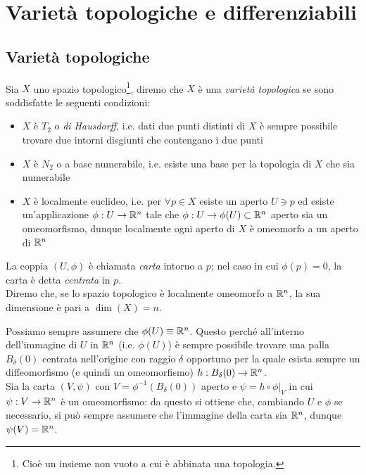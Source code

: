 \section{Varietà topologiche e differenziabili}

\subsection{Varietà topologiche}

Sia $ X $ uno spazio topologico\footnote{%
	Cioè un insieme non vuoto a cui è abbinata una topologia.%
}, diremo che $ X $ è una \textit{varietà topologica} se sono soddisfatte le seguenti condizioni:

\begin{itemize}
	\item $ X $ è $ T_{2} $ o \textit{di Hausdorff}, i.e. dati due punti distinti di $ X $ è sempre possibile trovare due intorni disgiunti che contengano i due punti
	
	\item $ X $ è $ N_{2} $ o a base numerabile, i.e. esiste una base per la topologia di $ X $ che sia numerabile
	
	\item $ X $ è localmente euclideo, i.e. per $ \forall p \in X $ esiste un aperto $ U \ni p $ ed esiste un'applicazione $ \phi : U \to \mathbb{R}^{n} $ tale che $ \phi : U \to \phi(U) \subset \mathbb{R}^{n} $ aperto sia un omeomorfismo, dunque localmente ogni aperto di $ X $ è omeomorfo a un aperto di $ \mathbb{R}^{n} $
\end{itemize}

La coppia $ (U,\phi) $ è chiamata \textit{carta} intorno a $ p $; nel caso in cui $ \phi(p)=0 $, la carta è detta \textit{centrata} in $ p $.\\
Diremo che, se lo spazio topologico è localmente omeomorfo a $ \mathbb{R}^{n} $, la sua dimensione è pari a $ \dim (X) = n $.

\begin{remark}
	Possiamo sempre assumere che $ \phi(U) \equiv \mathbb{R}^{n} $. Questo perché all'interno dell'immagine di $ U $ in $ \mathbb{R}^{n} $ (i.e. $ \phi(U) $) è sempre possibile trovare una palla $ B_{\delta}(0) $ centrata nell'origine con raggio $ \delta $ opportuno per la quale esista sempre un diffeomorfismo (e quindi un omeomorfismo) $ h : B_{\delta}(0) \to \mathbb{R}^{n} $.\\
	Sia la carta $ (V,\psi) $ con $ V = \phi^{-1}(B_{\delta}(0)) $ aperto e $ \psi = h \circ \left. \phi \right|_{V} $ in cui $ \psi : V \to \mathbb{R}^{n} $ è un omeomorfismo: da questo si ottiene che, cambiando $ U $ e $ \phi $ se necessario, si può sempre assumere che l'immagine della carta sia $ \mathbb{R}^{n} $, dunque $ \psi(V) = \mathbb{R}^{n} $.
	
\end{remark}

